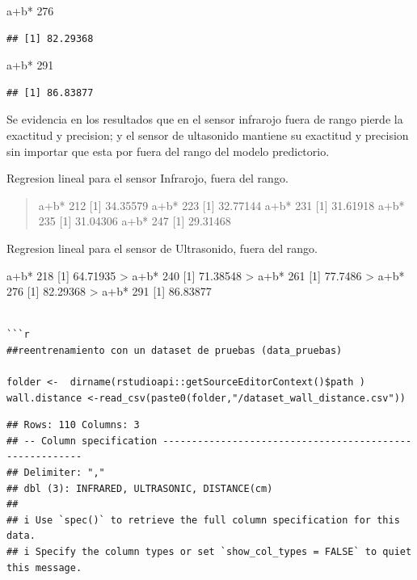 \documentclass[
]{article}
\newenvironment{Shaded}{\begin{snugshade}}{\end{snugshade}}
\newcommand{\DecValTok}[1]{\textcolor[rgb]{0.00,0.00,0.81}{#1}}
\newcommand{\NormalTok}[1]{#1}
\newcommand{\SpecialCharTok}[1]{\textcolor[rgb]{0.00,0.00,0.00}{#1}}
\begin{document}
\begin{Shaded}
\begin{Highlighting}[]
\NormalTok{a}\SpecialCharTok{+}\NormalTok{b}\SpecialCharTok{*} \DecValTok{276}
\end{Highlighting}
\end{Shaded}

\begin{verbatim}
## [1] 82.29368
\end{verbatim}

\begin{Shaded}
\begin{Highlighting}[]
\NormalTok{a}\SpecialCharTok{+}\NormalTok{b}\SpecialCharTok{*} \DecValTok{291}
\end{Highlighting}
\end{Shaded}

\begin{verbatim}
## [1] 86.83877
\end{verbatim}

Se evidencia en los resultados que en el sensor infrarojo fuera de rango
pierde la exactitud y precision; y el sensor de ultasonido mantiene su
exactitud y precision sin importar que esta por fuera del rango del
modelo predictorio.

Regresion lineal para el sensor Infrarojo, fuera del rango.

\begin{quote}
a+b* 212 {[}1{]} 34.35579 a+b* 223 {[}1{]} 32.77144 a+b* 231 {[}1{]}
31.61918 a+b* 235 {[}1{]} 31.04306 a+b* 247 {[}1{]} 29.31468
\end{quote}

Regresion lineal para el sensor de Ultrasonido, fuera del rango.

a+b* 218 {[}1{]} 64.71935 \textgreater{} a+b* 240 {[}1{]} 71.38548
\textgreater{} a+b* 261 {[}1{]} 77.7486 \textgreater{} a+b* 276 {[}1{]}
82.29368 \textgreater{} a+b* 291 {[}1{]} 86.83877

\begin{verbatim}

```r
##reentrenamiento con un dataset de pruebas (data_pruebas)

folder <-  dirname(rstudioapi::getSourceEditorContext()$path )
wall.distance <-read_csv(paste0(folder,"/dataset_wall_distance.csv"))
\end{verbatim}

\begin{verbatim}
## Rows: 110 Columns: 3
## -- Column specification --------------------------------------------------------
## Delimiter: ","
## dbl (3): INFRARED, ULTRASONIC, DISTANCE(cm)
## 
## i Use `spec()` to retrieve the full column specification for this data.
## i Specify the column types or set `show_col_types = FALSE` to quiet this message.
\end{verbatim}
\end{document}
